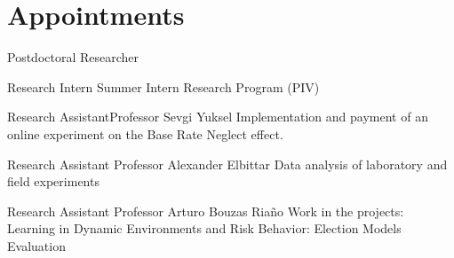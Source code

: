 \section{Appointments}

{Postdoctoral Researcher}{}{}{}

{Research Intern}
{}{}
{Summer Intern Research Program (PIV)}

{Research Assistant}{Professor Sevgi Yuksel}
{}
{Implementation and payment of an online experiment on the Base Rate Neglect effect.}

{Research Assistant}
{Professor Alexander Elbittar}
{}
{Data analysis of  laboratory and field experiments}

{Research Assistant}
{Professor Arturo Bouzas Riaño}
{}
{Work in the projects: Learning in Dynamic Environments and Risk Behavior: Election Models Evaluation}{}{}{}

%

%
	 
	 
